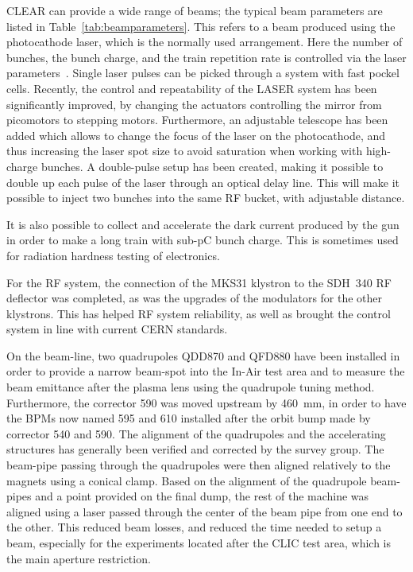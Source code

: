 \documentclass[a4paper,
               keeplastbox,   %
               ]{jacow}
\begin{document}
CLEAR can provide a wide range of beams; the typical beam parameters are listed in Table~\ref{tab:beamparameters}.
This refers to a beam produced using the photocathode laser, which is the normally used arrangement.
Here the number of bunches, the bunch charge, and the train repetition rate is controlled via the laser parameters~\cite{LucaGun,BrossardGun}.
Single laser pulses can be picked through a system with fast pockel cells.
Recently, the control and repeatability of the LASER system has been significantly improved, by changing the actuators controlling the mirror from picomotors to stepping motors.
Furthermore, an adjustable telescope has been added which allows to change the focus of the laser on the photocathode, and thus increasing the laser spot size to avoid saturation when working with high-charge bunches.
A double-pulse setup has been created, making it possible to double up each pulse of the laser through an optical delay line.
This will make it possible to inject two bunches into the same RF bucket, with adjustable distance.

It is also possible to collect and accelerate the dark current produced by the gun in order to make a long train with sub-pC bunch charge.
This is sometimes used for radiation hardness testing of electronics.

For the RF system, the connection of the MKS31 klystron to the SDH~340 RF deflector was completed, as was the upgrades of the modulators for the other klystrons.
This has helped RF system reliability, as well as brought the control system in line with current CERN standards.


On the beam-line, two quadrupoles QDD870 and QFD880 have been installed in order to provide a narrow beam-spot into the In-Air test area and to measure the beam emittance after the plasma lens using the quadrupole tuning method.
Furthermore, the corrector 590 was moved upstream by 460~mm, in order to have the BPMs now named 595 and 610 installed after the orbit bump made by corrector 540 and 590.
The alignment of the quadrupoles and the accelerating structures has generally been verified and corrected by the survey group.
The beam-pipe passing through the quadrupoles were then aligned relatively to the magnets using a conical clamp.
Based on the alignment of the quadrupole beam-pipes and a point provided on the final dump, the rest of the machine was aligned using a laser passed through the center of the beam pipe from one end to the other.
This reduced beam losses, and reduced the time needed to setup a beam, especially for the experiments located after the CLIC test area, which is the main aperture restriction.
\end{document}
